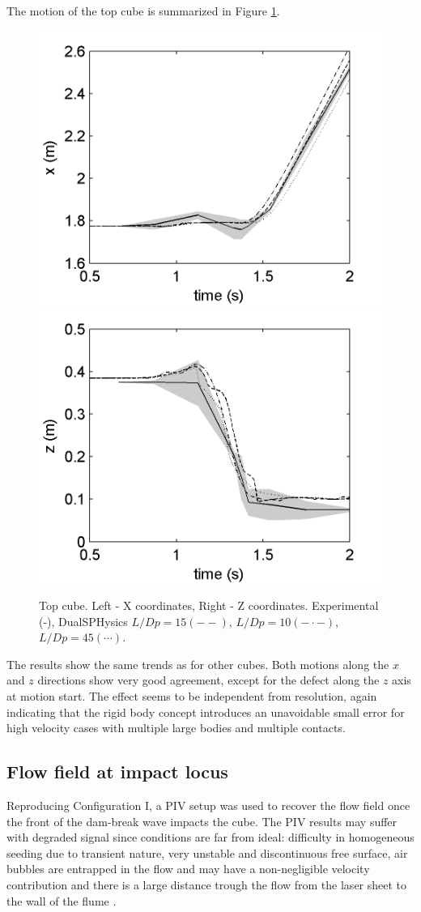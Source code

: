 The motion of the top cube is summarized in Figure \ref{fig:cube6}.
%
\begin{figure}[ht!]
	\centering 
	\includegraphics[width=0.45\linewidth]{Figures/5.Chapter/Fig_10a}
	\includegraphics[width=0.45\linewidth]{Figures/5.Chapter/Fig_10b}
	\caption{Top cube. Left - X coordinates, Right - Z coordinates. Experimental (-), DualSPHysics $L/Dp=15 (- -)$, $L/Dp=10 (- \cdot -)$, $L/Dp=45 (\cdots)$.}
	\label{fig:cube6} 
\end{figure}
%
The results show the same trends as for other cubes. Both motions along the $x$ and $z$ directions show very good agreement, except for the defect along the $z$ axis at motion start. The effect seems to be independent from resolution, again indicating that the rigid body concept introduces an unavoidable small error for high velocity cases with multiple large bodies and multiple contacts.


\subsection{Flow field at impact locus}
\label{Subsect:PIV}

Reproducing Configuration I, a \ac{PIV} setup was used to recover the flow field once the front of the dam-break wave impacts the cube. The \ac{PIV} results may suffer with degraded signal since conditions are far from ideal: difficulty in homogeneous seeding due to transient nature, very unstable and discontinuous free surface, air bubbles are entrapped in the flow and may have a non-negligible velocity contribution and there is a large distance trough the flow from the laser sheet to the wall of the flume \citep{ferreira-2011}.

